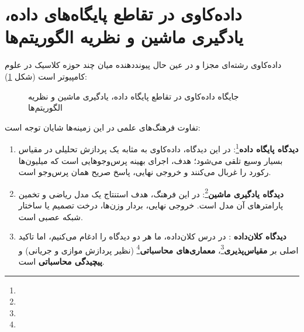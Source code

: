 \section{داده‌کاوی در تقاطع پایگاه‌های داده، یادگیری ماشین و نظریه الگوریتم‌ها}
داده‌کاوی رشته‌ای مجزا و در عین حال پیونددهنده میان چند حوزه کلاسیک در علوم کامپیوتر است (شکل \ref{fig:dm-intersection}):

\begin{figure}[H]
\centering
{}
\caption{جایگاه داده‌کاوی در تقاطع پایگاه داده، یادگیری ماشین و نظریه الگوریتم‌ها}
\label{fig:dm-intersection}
\end{figure}

تفاوت فرهنگ‌های علمی در این زمینه‌ها شایان توجه است:
\begin{enumerate}
    \item \textbf{دیدگاه پایگاه داده}\footnote{}: در این دیدگاه، داده‌کاوی به مثابه یک پردازش تحلیلی در مقیاس بسیار وسیع  تلقی می‌شود؛ هدف، اجرای بهینه پرس‌وجوهایی است که میلیون‌ها رکورد را غربال می‌کنند و خروجی نهایی، پاسخ صریح همان پرس‌وجو است.
    \item \textbf{دیدگاه یادگیری ماشین}\footnote{}: در این فرهنگ، هدف استنتاج یک مدل ریاضی و تخمین پارامترهای آن مدل است. خروجی نهایی، بردار وزن‌ها، درخت تصمیم یا ساختار شبکه عصبی است.
    \item \textbf{دیدگاه کلان‌داده }: در درس کلان‌داده، ما هر دو دیدگاه را ادغام می‌کنیم، اما تاکید اصلی بر \textbf{مقیاس‌پذیری}\footnote{}، \textbf{معماری‌های محاسباتی}\footnote{} (نظیر پردازش موازی و جریانی) و \textbf{پیچیدگی محاسباتی} است.
\end{enumerate}

